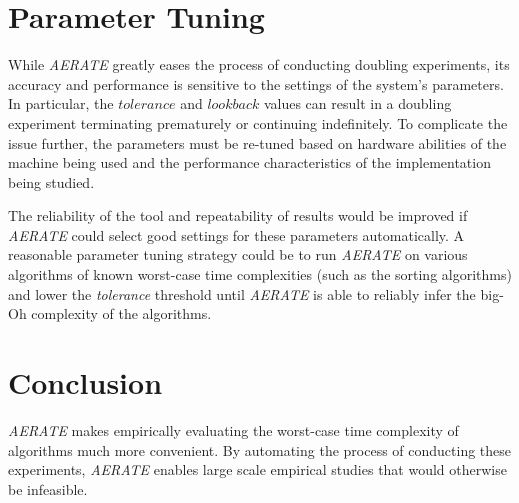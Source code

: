 \documentclass[10pt,twocolumn]{article}
\begin{document}
\section{Parameter Tuning}
  While \textit{AERATE} greatly eases the process of conducting
  doubling experiments, its accuracy and performance is
  sensitive to the settings of the system's parameters.  In particular,
  the $\mathit{tolerance}$ and $\mathit{lookback}$ values can result in
  a doubling experiment terminating prematurely or continuing
  indefinitely.
  To complicate the issue further, the parameters must be re-tuned based
  on hardware abilities of the machine being used and the performance
  characteristics of the implementation being studied.

  The reliability of the tool and repeatability of results would be
  improved if \textit{AERATE} could select good settings for these
  parameters automatically. A reasonable parameter tuning strategy could
  be to run \textit{AERATE} on various algorithms of known worst-case
  time complexities (such as the sorting algorithms) and lower the
  \textit{tolerance} threshold until \textit{AERATE} is able to reliably 
  infer the big-Oh complexity of the algorithms. 

\section{Conclusion}
  \textit{AERATE} makes empirically evaluating the worst-case time
  complexity of algorithms much more convenient. By automating the
  process of conducting these experiments, \textit{AERATE} enables large
  scale empirical studies that would otherwise be infeasible.

\setlength{\bibitemsep}{.075in}
{\footnotesize
  
}
\end{document}
